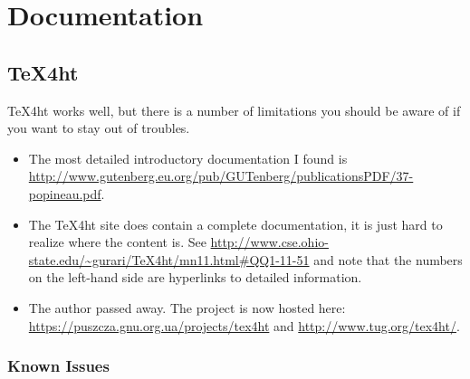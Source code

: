\documentclass[openright,twoside,11pt]{book}
\begin{document}
\chapter{Documentation}

\section{TeX4ht}

TeX4ht works well, but there is a number of limitations you should be
aware of if you want to stay out of troubles.
\begin{itemize}
\item The most detailed introductory documentation I found is
  \url{http://www.gutenberg.eu.org/pub/GUTenberg/publicationsPDF/37-popineau.pdf}.
\item The TeX4ht site does contain a complete documentation, it is
  just hard to realize where the content is.  See
  \url{http://www.cse.ohio-state.edu/~gurari/TeX4ht/mn11.html#QQ1-11-51}
  and note that the numbers on the left-hand side are hyperlinks to
  detailed information.
\item The author passed away.  The project is now hosted here:
  \url{https://puszcza.gnu.org.ua/projects/tex4ht} and
  \url{http://www.tug.org/tex4ht/}.
\end{itemize}

\subsection{Known Issues}
\end{document}

